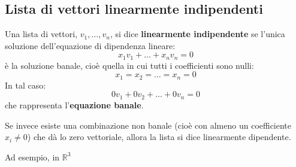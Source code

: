 \documentclass[a4paper,12pt]{article}
\begin{document}
	\subsection{Lista di vettori linearmente indipendenti}
	Una lista di vettori, $v_1, \dots, v_n$, si dice \textbf{linearmente indipendente} se l’unica soluzione dell’equazione di dipendenza lineare:
	\[x_1 v_1 + \dots + x_n v_n = 0\]
	è la soluzione banale, cioè quella in cui tutti i coefficienti sono nulli:
	\[x_1 = x_2 = \dots = x_n = 0\]
	In tal caso:
	\[0v_1 + 0v_2 + \dots + 0v_n = 0\]
	che rappresenta l’\textbf{equazione banale}.
	
	Se invece esiste una combinazione non banale (cioè con almeno un coefficiente $x_i \not = 0$) che dà lo zero vettoriale, allora la lista si dice linearmente dipendente.
	
	Ad esempio, in $\mathbb{R}^3$
\end{document}
